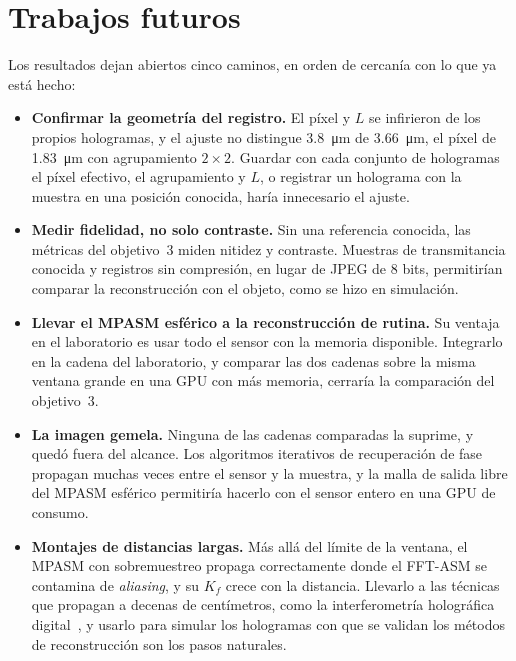 \section{Trabajos futuros}

Los resultados dejan abiertos cinco caminos, en orden de cercanía con lo que
ya está hecho:
\begin{itemize}
  \item \textbf{Confirmar la geometría del registro.} El píxel y $L$ se
  infirieron de los propios hologramas, y el ajuste no distingue
  \SI{3.8}{\micro\metre} de \SI{3.66}{\micro\metre}, el píxel de
  \SI{1.83}{\micro\metre} con agrupamiento $2\times2$. Guardar con cada
  conjunto de hologramas el píxel efectivo, el agrupamiento y $L$, o registrar
  un holograma con la muestra en una posición conocida, haría innecesario el
  ajuste.
  \item \textbf{Medir fidelidad, no solo contraste.} Sin una referencia conocida,
  las métricas del objetivo~3 miden nitidez y contraste. Muestras de
  transmitancia conocida y registros sin compresión, en lugar de JPEG de 8
  bits, permitirían comparar la reconstrucción con el objeto, como se hizo en
  simulación.
  \item \textbf{Llevar el MPASM esférico a la reconstrucción de rutina.} Su
  ventaja en el laboratorio es usar todo el sensor con la memoria disponible.
  Integrarlo en la cadena del laboratorio, y comparar las dos cadenas sobre la
  misma ventana grande en una GPU con más memoria, cerraría la comparación del
  objetivo~3.
  \item \textbf{La imagen gemela.} Ninguna de las cadenas comparadas la
  suprime, y quedó fuera del alcance. Los algoritmos iterativos de
  recuperación de fase propagan muchas veces entre el sensor y la muestra, y la
  malla de salida libre del MPASM esférico permitiría hacerlo con el sensor
  entero en una GPU de consumo.
  \item \textbf{Montajes de distancias largas.} Más allá del límite de la
  ventana, el MPASM con sobremuestreo propaga correctamente donde el FFT-ASM
  se contamina de \emph{aliasing}, y su $K_f$ crece con la distancia. Llevarlo
  a las técnicas que propagan a decenas de centímetros, como la
  interferometría holográfica digital~\cite{schnars2005}, y usarlo para
  simular los hologramas con que se validan los métodos de reconstrucción son
  los pasos naturales.
\end{itemize}
